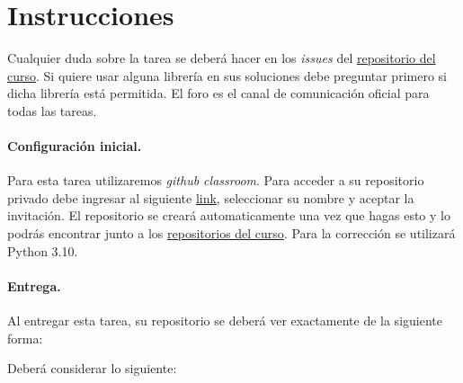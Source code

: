 
\section*{Instrucciones}

Cualquier duda sobre la tarea se deberá hacer en los \emph{issues} del \href{https://github.com/IIC3253/2023}{repositorio del curso}. Si quiere usar alguna librería en sus soluciones debe preguntar primero si dicha librería está permitida. El foro es el canal de comunicación oficial para todas las tareas.

\paragraph{Configuración inicial.} 
Para esta tarea utilizaremos \textit{github classroom}. 
Para acceder a su repositorio privado debe ingresar al siguiente \href{https://classroom.github.com/a/vN158nKj}{link}, seleccionar su nombre y aceptar la invitación.
El repositorio se creará automaticamente una vez que hagas esto y lo podrás encontrar junto a los \href{https://github.com/orgs/IIC3253/repositories}{repositorios del curso}.
Para la corrección se utilizará Python 3.10.

\paragraph{Entrega.} Al entregar esta tarea, su repositorio se deberá ver exactamente de la siguiente forma:

\bigskip


\bigskip

Deberá considerar lo siguiente:

